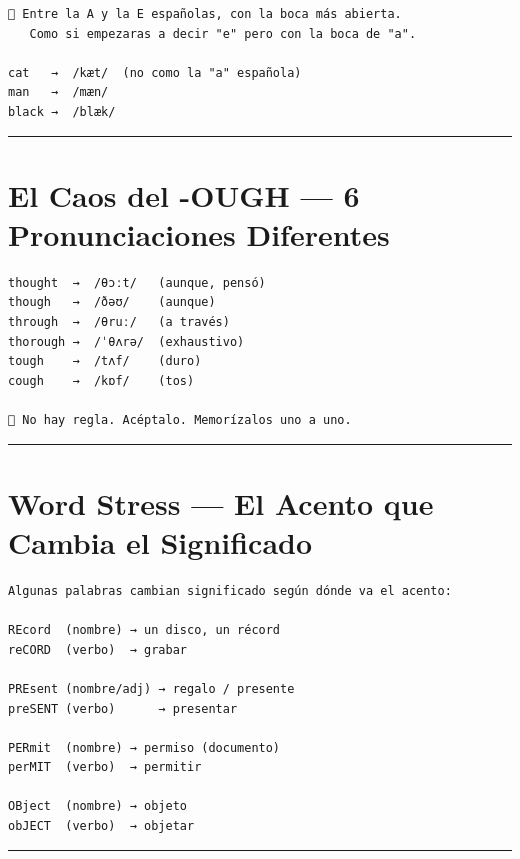\documentclass[
  spanish,
  letterpaper,
]{scrbook}
\begin{document}
\begin{verbatim}
🧠 Entre la A y la E españolas, con la boca más abierta.
   Como si empezaras a decir "e" pero con la boca de "a".

cat   →  /kæt/  (no como la "a" española)
man   →  /mæn/
black →  /blæk/
\end{verbatim}

\begin{center}\rule{0.5\linewidth}{0.5pt}\end{center}

\section{El Caos del -OUGH --- 6 Pronunciaciones
Diferentes}\label{el-caos-del--ough-6-pronunciaciones-diferentes}

\begin{verbatim}
thought  →  /θɔːt/   (aunque, pensó)
though   →  /ðəʊ/    (aunque)
through  →  /θruː/   (a través)
thorough →  /ˈθʌrə/  (exhaustivo)
tough    →  /tʌf/    (duro)
cough    →  /kɒf/    (tos)

🧠 No hay regla. Acéptalo. Memorízalos uno a uno.
\end{verbatim}

\begin{center}\rule{0.5\linewidth}{0.5pt}\end{center}

\section{Word Stress --- El Acento que Cambia el
Significado}\label{word-stress-el-acento-que-cambia-el-significado}

\begin{verbatim}
Algunas palabras cambian significado según dónde va el acento:

REcord  (nombre) → un disco, un récord
reCORD  (verbo)  → grabar

PREsent (nombre/adj) → regalo / presente
preSENT (verbo)      → presentar

PERmit  (nombre) → permiso (documento)
perMIT  (verbo)  → permitir

OBject  (nombre) → objeto
obJECT  (verbo)  → objetar
\end{verbatim}

\begin{center}\rule{0.5\linewidth}{0.5pt}\end{center}
\end{document}
